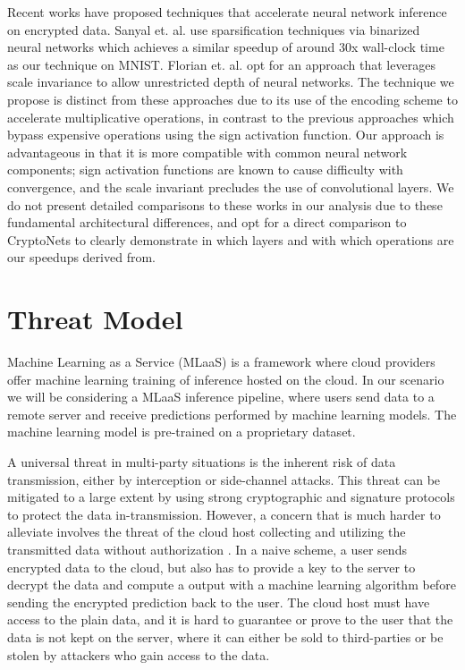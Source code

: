 \documentclass[conference]{IEEEtran}
\begin{document}
Recent works have proposed techniques that accelerate neural network inference on encrypted data.
Sanyal et. al. \cite{sanyal2018tapas} use sparsification techniques via binarized neural networks which achieves a similar speedup of around 30x wall-clock time as our technique on MNIST.
Florian et. al. \cite{florian2017fastdiscretize} opt for an approach that leverages scale invariance to allow unrestricted depth of neural networks.  The technique we propose is distinct from these approaches due to its use of the encoding scheme to accelerate multiplicative operations, in contrast to the previous approaches which bypass expensive operations using the sign activation function. Our approach is advantageous in that it is more compatible with common neural network components; sign activation functions are known to cause difficulty with convergence, and the scale invariant \cite{florian2017fastdiscretize} precludes the use of convolutional layers.  We do not present detailed comparisons to these works in our analysis due to these fundamental architectural differences, and opt for a direct comparison to CryptoNets to clearly demonstrate in which layers and with which operations are our speedups derived from.


\section{Threat Model}\label{sec:threat_model}
Machine Learning as a Service (MLaaS) \cite{bae2018securityprivacyissues} is a framework where cloud providers offer machine learning training of inference hosted on the cloud.  In our scenario we will be considering a MLaaS inference pipeline, where users send data to a remote server and receive predictions performed by machine learning models.  The machine learning model is pre-trained on a proprietary dataset.

A universal threat in multi-party situations is the inherent risk of data transmission, either by interception or side-channel attacks.  This threat can be mitigated to a large extent by using strong cryptographic and signature protocols to protect the data in-transmission. However, a concern that is much harder to alleviate involves the threat of the cloud host collecting and utilizing the transmitted data without authorization \cite{bae2018securityprivacyissues}.  In a naive scheme, a user sends encrypted data to the cloud, but also has to provide a key to the server to decrypt the data and compute a output with a machine learning algorithm before sending the encrypted prediction back to the user.  The cloud host must have access to the plain data, and it is hard to guarantee or prove to the user that the data is not kept on the server, where it can either be sold to third-parties or be stolen by attackers who gain access to the data.
\end{document}
